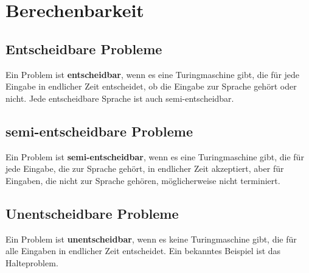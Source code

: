 \documentclass{article}
\begin{document}
\section*{Berechenbarkeit}
\begin{minipage}[t]{0.45\textwidth}
    \subsection*{Entscheidbare Probleme}
    Ein Problem ist \textbf{entscheidbar}, wenn es eine Turingmaschine gibt, die für jede Eingabe in endlicher Zeit entscheidet, ob die Eingabe zur Sprache gehört oder nicht.
    Jede entscheidbare Sprache ist auch semi-entscheidbar.
    
    \subsection*{semi-entscheidbare Probleme}
    Ein Problem ist \textbf{semi-entscheidbar}, wenn es eine Turingmaschine gibt, die für jede Eingabe, die zur Sprache gehört, in endlicher Zeit akzeptiert, aber für Eingaben, die nicht zur Sprache gehören, möglicherweise nicht terminiert.

    \subsection*{Unentscheidbare Probleme}
    Ein Problem ist \textbf{unentscheidbar}, wenn es keine Turingmaschine gibt, die für alle Eingaben in endlicher Zeit entscheidet. Ein bekanntes Beispiel ist das Halteproblem.
\end{minipage}
\hfill
\end{document}
